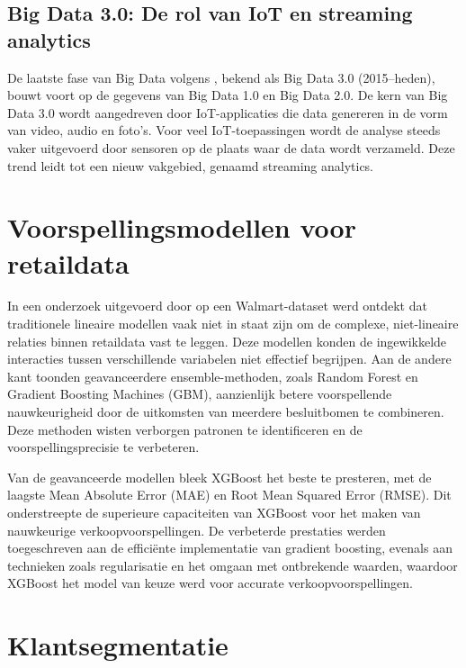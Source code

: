 \subsection{Big Data 3.0: De rol van IoT en streaming analytics}  

De laatste fase van Big Data volgens \textcite{Lee2017}, bekend als Big Data 3.0 (2015–heden), bouwt voort op de gegevens van Big Data 1.0 en Big Data 2.0. De kern van Big Data 3.0 wordt aangedreven door IoT-applicaties die data genereren in de vorm van video, audio en foto’s. Voor veel IoT-toepassingen wordt de analyse steeds vaker uitgevoerd door sensoren op de plaats waar de data wordt verzameld. Deze trend leidt tot een nieuw vakgebied, genaamd streaming analytics.



\section{Voorspellingsmodellen voor retaildata}  

In een onderzoek uitgevoerd door \textcite{Neba2024}  op een Walmart-dataset werd ontdekt dat traditionele lineaire modellen vaak niet in staat zijn om de complexe, niet-lineaire relaties binnen retaildata vast te leggen. Deze modellen konden de ingewikkelde interacties tussen verschillende variabelen niet effectief begrijpen. Aan de andere kant toonden geavanceerdere ensemble-methoden, zoals Random Forest en Gradient Boosting Machines (GBM), aanzienlijk betere voorspellende nauwkeurigheid door de uitkomsten van meerdere besluitbomen te combineren. Deze methoden wisten verborgen patronen te identificeren en de voorspellingsprecisie te verbeteren.

\vspace{1 em}

Van de geavanceerde modellen bleek XGBoost het beste te presteren, met de laagste Mean Absolute Error (MAE) en Root Mean Squared Error (RMSE). Dit onderstreepte de superieure capaciteiten van XGBoost voor het maken van nauwkeurige verkoopvoorspellingen. De verbeterde prestaties werden toegeschreven aan de efficiënte implementatie van gradient boosting, evenals aan technieken zoals regularisatie en het omgaan met ontbrekende waarden, waardoor XGBoost het model van keuze werd voor accurate verkoopvoorspellingen.

\vspace{10 mm}

\section{Klantsegmentatie}  

